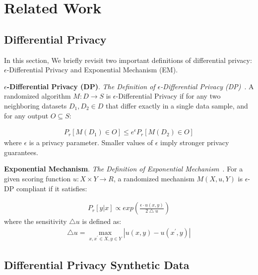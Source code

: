 \section{Related Work}
\subsection{Differential Privacy}
\label{sec:dp}
In this section, We briefly revisit two important definitions of differential privacy: $\epsilon$-Differential Privacy and Exponential Mechanism (EM).

\textbf{$\epsilon$-Differential Privacy (DP)}.
\textit{The Definition of $\epsilon$-Differential Privacy (DP)}~\cite{dwork2006differential}. 
A randomized algorithm $M: D \to S $ is $\epsilon$-Differential Privacy if for any two neighboring datasets $D_1, D_2 \in D$ that differ exactly in a single data sample, and for any output $O \subseteq S$:

\begin{equation}\label{eq:dp-0}
\begin{aligned}
     P_r[M(D_1) \in O] \le e^{\epsilon} P_r[M(D_2) \in O]
\end{aligned}
\end{equation}
where $\epsilon$ is a privacy parameter. Smaller values of $\epsilon$ imply stronger privacy guarantees.


\textbf{Exponential Mechanism}.
\textit{The Definition of Exponential Mechanism}~\cite{mcsherry2007mechanism,tong2023privinfer}. For a given scoring function $u: X\times Y \to  R$, a randomized mechanism $M(X, u, Y)$ is $\epsilon$-DP compliant if it satisfies: 

\begin{equation}\label{eq:dp-1}
\begin{aligned}
     P_r[y|x]\propto exp(\frac{\epsilon \cdot u(x,y) }{2\bigtriangleup u }  )
\end{aligned}
\end{equation}
where the sensitivity $\bigtriangleup u$ is defined as:
\begin{equation}\label{eq:dp-2}
\begin{aligned}
    \bigtriangleup u = \max_{x,x^{'} \in X, y\in Y} |u(x,y) - u(x^{'},y)| 
\end{aligned}
\end{equation}


\subsection{Differential Privacy Synthetic Data}

